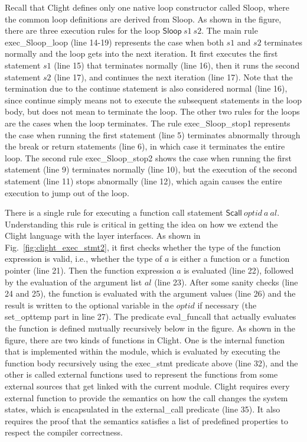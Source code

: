 Recall that Clight defines only one native loop constructor called \textsf{Sloop},
where the common loop definitions are derived from \textsf{Sloop}.
As shown in the figure, there are three execution rules for the loop $\textsf{Sloop}~s1~s2$.
The main rule \textsf{exec\_Sloop\_loop} (line 14-19) represents the case
when both $s1$ and $s2$ terminates normally and the loop gets into the next iteration.
It first executes the first statement $s1$ (line 15) that terminates normally (line 16),
then it runs the second statement $s2$ (line 17), and continues the next iteration (line 17).
Note that the termination due to the \textsf{continue} statement is also
considered normal (line 16), since \textsf{continue} simply means not to execute
the subsequent statements in the loop body, but does not mean to terminate the loop.
The other two rules for the loops are the cases when the loop terminates.
The rule \textsf{exec\_Sloop\_stop1} represents the case when running the first statement
(line 5) terminates abnormally through the \textsf{break} or \textsf{return} statements
(line 6), in which case it terminates the entire loop.
The second rule \textsf{exec\_Sloop\_stop2} shows the case when running the first
statement (line 9) terminates normally (line 10), but the execution of the second
statement (line 11) stops abnormally (line 12), which again causes the entire execution
to jump out of the loop.

There is a single rule for executing a function call statement
$\textsf{Scall}~optid~a~al$.
Understanding this rule is critical in getting the idea on how we extend the
Clight language with the layer interfaces. As shown in
Fig.~\ref{fig:clight_exec_stmt2}, it first checks whether the type
of the function expression is valid, i.e., whether the type of $a$ is
either a function or a function pointer (line 21).
Then the function expression $a$ is evaluated (line 22), followed
by the evaluation of the argument list $al$ (line 23). After some sanity checks
(line 24 and 25), the function is evaluated with the argument values
(line 26) and the result is written to the optional variable in the $optid$
if necessary (the \textsf{set\_opttemp} part in line 27).
The predicate \textsf{eval\_funcall} that actually evaluates the function
is defined mutually recursively below in the figure. 
As shown in the figure, there are two kinds of functions in Clight.
One is the internal function that is implemented within the module,
which is evaluated by executing the function body recursively using
the \textsf{exec\_stmt} predicate above (line 32), and the other
is called external functions used to represent the functions from
some external sources that get linked with the current module.
Clight requires every external function to provide the semantics on
how the call changes the system states, which is encapsulated in
the \textsf{external\_call} predicate (line 35). It also requires
the proof that the semantics satisfies a list of predefined properties
to respect the compiler correctness.


